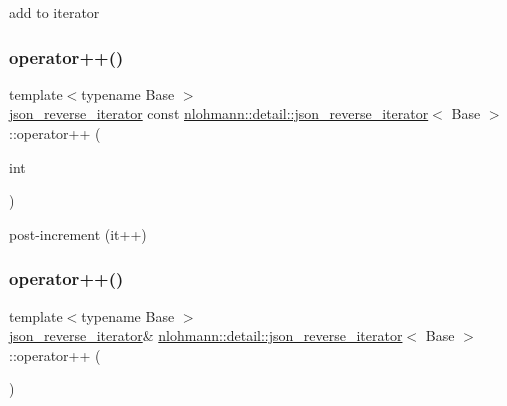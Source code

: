 add to iterator 

\mbox{\label{classnlohmann_1_1detail_1_1json__reverse__iterator_aada9d2b320002ef870c5283cda2c1e9d}} 
\subsubsection{\texorpdfstring{operator++()}{operator++()}\hspace{0.1cm}{\footnotesize\ttfamily [1/2]}}
{\footnotesize\ttfamily template$<$typename Base $>$ \\
\mbox{\hyperlink{classnlohmann_1_1detail_1_1json__reverse__iterator}{json\+\_\+reverse\+\_\+iterator}} const \mbox{\hyperlink{classnlohmann_1_1detail_1_1json__reverse__iterator}{nlohmann\+::detail\+::json\+\_\+reverse\+\_\+iterator}}$<$ Base $>$\+::operator++ (\begin{DoxyParamCaption}\item[{int}]{ }\end{DoxyParamCaption})\hspace{0.3cm}{\ttfamily [inline]}}



post-\/increment (it++) 

\mbox{\label{classnlohmann_1_1detail_1_1json__reverse__iterator_a26caf0069a50ce4ecb010a1453e883fc}} 
\subsubsection{\texorpdfstring{operator++()}{operator++()}\hspace{0.1cm}{\footnotesize\ttfamily [2/2]}}
{\footnotesize\ttfamily template$<$typename Base $>$ \\
\mbox{\hyperlink{classnlohmann_1_1detail_1_1json__reverse__iterator}{json\+\_\+reverse\+\_\+iterator}}\& \mbox{\hyperlink{classnlohmann_1_1detail_1_1json__reverse__iterator}{nlohmann\+::detail\+::json\+\_\+reverse\+\_\+iterator}}$<$ Base $>$\+::operator++ (\begin{DoxyParamCaption}{ }\end{DoxyParamCaption})\hspace{0.3cm}{\ttfamily [inline]}}



